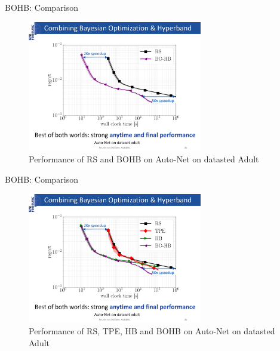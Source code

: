 \begin{frame}{BOHB: Comparison}
\begin{figure}
    \centering
    \includegraphics[width=0.68\textwidth]{w07_hpo_grey_box/images/bohb/BOHB_3.pdf}
    \caption{Performance of RS and BOHB on Auto-Net on datasted Adult}
\end{figure}

\end{frame}
\begin{frame}{BOHB: Comparison}
\begin{figure}
    \centering
    \includegraphics[width=0.68\textwidth]{w07_hpo_grey_box/images/bohb/BOHB_4.pdf}
    \caption{Performance of RS, TPE, HB and BOHB on Auto-Net on datasted Adult}
\end{figure}

\end{frame}
